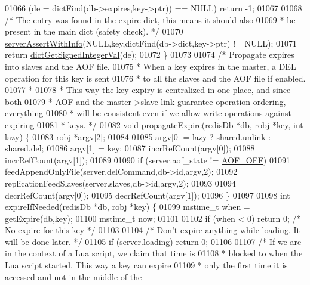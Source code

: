 \begin{DoxyCode}
01066        (de = dictFind(db->expires,key->ptr)) == NULL) \textcolor{keywordflow}{return} -1;
01067 
01068     \textcolor{comment}{/* The entry was found in the expire dict, this means it should also}
01069 \textcolor{comment}{     * be present in the main dict (safety check). */}
01070     \hyperlink{server_8h_a7308f76cbff9a8d3797fe78190b91282}{serverAssertWithInfo}(NULL,key,dictFind(db->dict,key->ptr) != NULL);
01071     \textcolor{keywordflow}{return} \hyperlink{dict_8h_a31f34bf34a743e3ebf122fa231b28d57}{dictGetSignedIntegerVal}(de);
01072 \}
01073 
01074 \textcolor{comment}{/* Propagate expires into slaves and the AOF file.}
01075 \textcolor{comment}{ * When a key expires in the master, a DEL operation for this key is sent}
01076 \textcolor{comment}{ * to all the slaves and the AOF file if enabled.}
01077 \textcolor{comment}{ *}
01078 \textcolor{comment}{ * This way the key expiry is centralized in one place, and since both}
01079 \textcolor{comment}{ * AOF and the master->slave link guarantee operation ordering, everything}
01080 \textcolor{comment}{ * will be consistent even if we allow write operations against expiring}
01081 \textcolor{comment}{ * keys. */}
01082 \textcolor{keywordtype}{void} propagateExpire(redisDb *db, robj *key, \textcolor{keywordtype}{int} lazy) \{
01083     robj *argv[2];
01084 
01085     argv[0] = lazy ? shared.unlink : shared.del;
01086     argv[1] = key;
01087     incrRefCount(argv[0]);
01088     incrRefCount(argv[1]);
01089 
01090     \textcolor{keywordflow}{if} (server.aof\_state != \hyperlink{server_8h_a5226306fbcebcb6d5d02e0fef3c213c2}{AOF\_OFF})
01091         feedAppendOnlyFile(server.delCommand,db->id,argv,2);
01092     replicationFeedSlaves(server.slaves,db->id,argv,2);
01093 
01094     decrRefCount(argv[0]);
01095     decrRefCount(argv[1]);
01096 \}
01097 
01098 \textcolor{keywordtype}{int} expireIfNeeded(redisDb *db, robj *key) \{
01099     mstime\_t when = getExpire(db,key);
01100     mstime\_t now;
01101 
01102     \textcolor{keywordflow}{if} (when < 0) \textcolor{keywordflow}{return} 0; \textcolor{comment}{/* No expire for this key */}
01103 
01104     \textcolor{comment}{/* Don't expire anything while loading. It will be done later. */}
01105     \textcolor{keywordflow}{if} (server.loading) \textcolor{keywordflow}{return} 0;
01106 
01107     \textcolor{comment}{/* If we are in the context of a Lua script, we claim that time is}
01108 \textcolor{comment}{     * blocked to when the Lua script started. This way a key can expire}
01109 \textcolor{comment}{     * only the first time it is accessed and not in the middle of the}

\end{DoxyCode}
